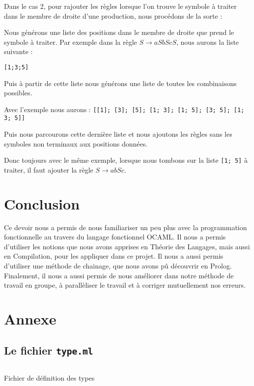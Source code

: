 \documentclass[11pt,a4paper]{article}
\def\code#1{\texttt{#1}} %
\begin{document}
Dans le cas 2, pour rajouter les règles lorsque l'on trouve le symbole à traiter dans
le membre de droite d'une production, nous procédons de la sorte : 

Nous générons une liste des positions dans le membre de droite que prend le symbole à traiter.
Par exemple dans la règle $S \rightarrow aSbScS$, nous aurons la liste suivante : 

\code{[1;3;5]}

Puis à partir de cette liste nous générons une liste de toutes les combinaisons possibles.

Avec l'exemple nous aurons : \code{[[1]; [3]; [5]; [1; 3]; [1; 5]; [3; 5]; [1; 3; 5]]}

Puis nous parcourons cette dernière liste et nous ajoutons les règles sans les symboles 
non terminaux aux positions données.

Donc toujours avec le même exemple, lorsque nous tombons sur la liste \code{[1; 5]} à traiter, il faut ajouter
la règle $S \rightarrow abSc $.
\newpage

\section{Conclusion}
Ce devoir nous a permis de nous familiariser un peu plus avec la
programmation fonctionnelle au travers du langage fonctionnel OCAML. Il nous a permis d'utiliser les notions que nous avons apprises en Théorie des Langages, mais aussi en Compilation, pour les appliquer
dans ce projet. Il nous a aussi permis d'utiliser une méthode de chainage, que nous avons pû découvrir en Prolog. Finalement, il nous a aussi permis de nous améliorer dans notre méthode de travail en groupe, à parallèliser le travail et à corriger mutuellement nos erreurs.

\newpage

\section{Annexe}

\subsection{Le fichier \code{type.ml}}

\begin{listing}[ht]
\inputminted[firstline = 1, lastline = 3]{ocaml}{type.ml}
\caption{Fichier de définition des types}
\label{listing:3}
\end{listing}
\end{document}
